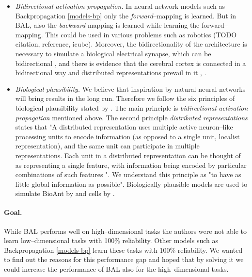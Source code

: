 \begin{itemize} 

\item \emph{Bidirectional activation propagation.} In neural network models such as Backpropagation \ref{models-bp} only the \emph{forward}--mapping is learned. But in BAL, also the \emph{backward} mapping is learned while learning the forward--mapping. This could be used in various problems such as robotics (TODO citation, reference, icube). Moreover, the bidirectionality of the architecture is necessary to simulate a biological electrical synapse, which can be bidirectional \citep{kandel1995essentials}, \citep{rosa2002biologically} and there is evidence that the cerebral cortex is connected in a bidirectional way and distributed representations prevail in it \citep{o2000computational}, \citep{da2011advances}. 

\item \emph{Biological plausibility.} We believe that inspiration by natural neural networks will bring results in the long run. Therefore we follow the six principles of biological plausibility stated by \citet{hinton1988learning}. The main principle is \emph{bidirectional activation propagation} mentioned above. The second principle \emph{distributed representations} states that "A distributed representation uses multiple active neuron--like processing units to encode information (as opposed to a single unit, localist representation), and the same unit can participate in multiple representations. Each unit in a distributed representation can be thought of as representing a single feature, with information being encoded by particular combinations of such features \citep{hinton1988learning}". We understand this principle as "to have as little global information as possible". Biologically plausible models are used to simulate BioAnt by \citet{schneider2009application} and cells by \citet{nawrocki2012monitoring}. 

\end{itemize} 

\paragraph{Goal.}
While BAL performs well on high--dimensional tasks the authors were not able to learn low--dimensional tasks with 100\% reliability. Other models such as Backpropagation \citep{rumelhart1986learning} \ref{models-bp} learn these tasks with 100\% reliability. We wanted to find out the reasons for this performance gap and hoped that by solving it we could increase the performance of BAL also for the high--dimensional tasks. 

